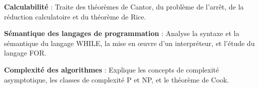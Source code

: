 \label{ch:Quick Summary}

\vspace{2ex} %

\textbf{Calculabilit\'e } : Traite des th\'eor\`emes de Cantor, du probl\`eme de l'arr\^et, de la r\'eduction calculatoire et du th\'eor\`eme de Rice.

\textbf{S\'emantique des langages de programmation } : Analyse la syntaxe et la s\'emantique du langage WHILE, la mise en \oe uvre d'un interpr\'eteur, et l'\'etude du langage FOR.

\textbf{Complexit\'e des algorithmes } : Explique les concepts de complexit\'e asymptotique, les classes de complexit\'e P et NP, et le th\'eor\`eme de Cook.

